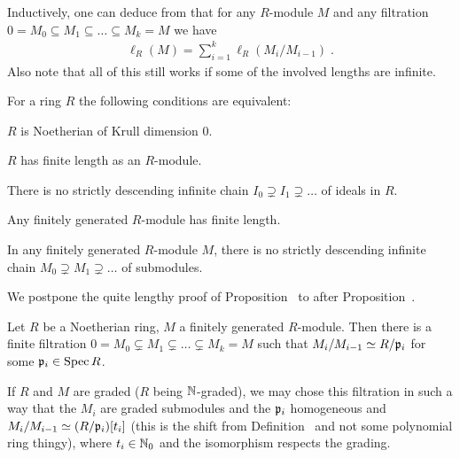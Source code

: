 \documentclass[a4paper,parskip=half,numbers=enddot, DIV=12]{scrreprt}
\begin{document}
\begin{rem}
\begin{alphanumerate}
        \item Inductively, one can deduce from  that for any $R$-module $M$ and any filtration $0=M_0\subseteq M_1\subseteq \ldots\subseteq M_k=M$ we have 
        \begin{align*}
        	\ell_R(M)=\sum_{i=1}^{k}\ell_R(M_i/M_{i-1})\;.
        \end{align*}
        Also note that all of this still works if some of the involved lengths are infinite.
    \end{alphanumerate}
\end{rem}
\begin{prop} 
    For a ring $R$ the following conditions are equivalent:
    \begin{alphanumerate}
    \item
        $R$ is Noetherian of Krull dimension $0$.
    \item  
        $R$ has finite length as an $R$-module.
    \item
        There is no strictly descending infinite chain $I_0\supsetneq I_1\supsetneq\ldots $ of ideals in $R$.
    \item
        Any finitely generated $R$-module has finite length.
    \item 
        In any finitely generated $R$-module $M$, there is no strictly descending infinite chain $M_0\supsetneq M_1\supsetneq \ldots$ of submodules.
    \end{alphanumerate}
\end{prop}
We postpone the quite lengthy proof of Proposition~ to after Proposition~.
\begin{prop}
    \begin{alphanumerate}
    \item {}
        Let $R$ be a Noetherian ring, $M$ a finitely generated $R$-module. Then there is a finite filtration $0 = M_0\subsetneq M_1\subsetneq\ldots\subsetneq M_k = M$ such that $M_i/M_{i-1} \simeq R/\mathfrak{p}_i$ for some $\mathfrak{p}_i\in \operatorname{Spec} R$.
    \item  
        If $R$ and $M$ are graded ($R$ being $\mathbb{N}$-graded), we may chose this filtration in such a way that the $M_i$ are graded submodules and the $\mathfrak{p}_i$ homogeneous and $M_i/M_{i-1} \simeq (R/\mathfrak{p}_i)[t_i]$ (this is the shift from Definition~ and not some polynomial ring thingy), where $t_i\in \mathbb{N}_0$ and the isomorphism respects the grading.
    \end{alphanumerate}
\end{prop}
\end{document}
